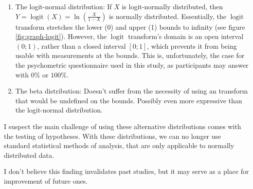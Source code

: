 \begin{enumerate}
    \item The logit-normal distribution: If $X$ is logit-normally distributed, then $Y = \operatorname{logit}(X) = \ln(\frac{X}{1 - X})$ is normally distributed. Essentially, the $\operatorname{logit}$ transform stretches the lower (0) and upper (1) bounds to infinity (see figure \ref{fig:graph-logit}). However, the $\operatorname{logit}$ transform's domain is an open interval $(0; 1)$, rather than a closed interval $[0; 1]$, which prevents it from being usable with measurements at the bounds. This is, unfortunately, the case for the psychometric questionnaire used in this study, as participants may answer with $0\%$ or $100\%$.
    \item The beta distribution: Doesn't suffer from the necessity of using an transform that would be undefined on the bounds. Possibly even more expressive than the logit-normal distribution.
\end{enumerate}

I suspect the main challenge of using these alternative distributions comes with the testing of hypotheses. With these distributions, we can no longer use standard statistical methods of analysis, that are only applicable to normally distributed data.

I don't believe this finding invalidates past studies, but it may serve as a place for improvement of future ones.

